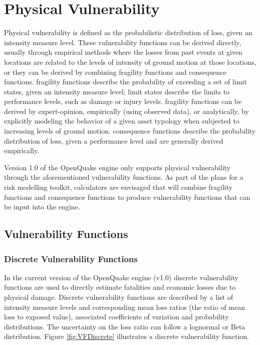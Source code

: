 \section{Physical Vulnerability}
Physical vulnerability is defined as the probabilistic distribution of loss, given an intensity measure level. These \glspl{vulnerability function} can be derived directly, usually through empirical methods where the losses from past events at given locations are related to the levels of intensity of ground motion at those locations, or they can be derived by combining \glspl{fragility function} and \glspl{consequence function}. \Glspl{fragility function} describe the probability of exceeding a set of limit states, given an intensity measure level; limit states describe the limits to performance levels, such as damage or injury levels. \Glspl{fragility function} can be derived by expert-opinion, empirically (using observed data), or analytically, by explicitly modeling the behavior of a given asset typology when subjected to increasing levels of ground motion. \Glspl{consequence function} describe the probability distribution of loss, given a performance level and are generally derived empirically. 

Version 1.0 of the OpenQuake engine only supports physical vulnerability through the aforementioned \glspl{vulnerability function}. As part of the plans for a risk modelling toolkit, calculators are envisaged that will combine \glspl{fragility function} and \glspl{consequence function} to produce \glspl{vulnerability function} that can be input into the engine. 

\subsection{Vulnerability Functions}
\subsubsection{Discrete Vulnerability Functions}
In the current version of the OpenQuake engine (v1.0) discrete \glspl{vulnerability function} are used to directly estimate fatalities and economic losses due to physical damage. Discrete \glspl{vulnerability function} are described by a list of intensity measure levels and corresponding mean loss ratios (the ratio of mean loss to exposed value), associated coefficients of variation and probability distributions. The uncertainty on the loss ratio can follow a lognormal or Beta distribution. Figure \ref{fig:VFDiscrete} illustrates a discrete \gls{vulnerability function}.


